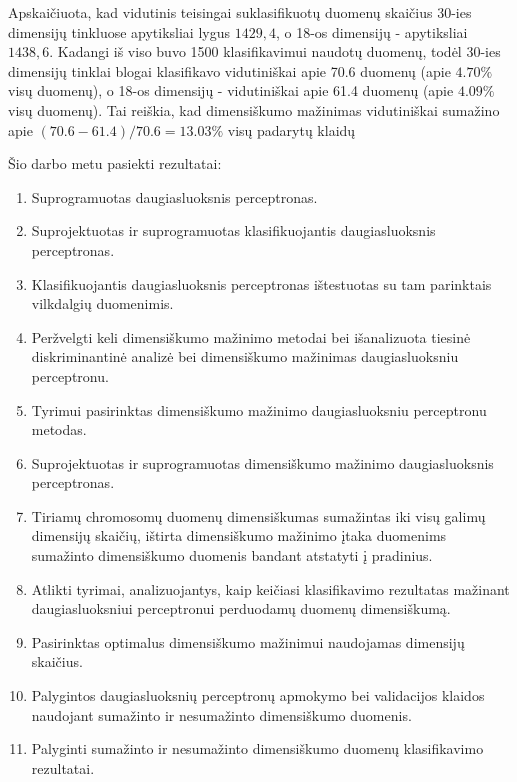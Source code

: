 \documentclass{VUMIFPSbakalaurinis}
\begin{document}
Apskaičiuota, kad vidutinis teisingai suklasifikuotų duomenų skaičius 30-ies dimensijų tinkluose apytiksliai lygus $1429,4$, o 18-os dimensijų - apytiksliai $1438,6$.
Kadangi iš viso buvo 1500 klasifikavimui naudotų duomenų, todėl 30-ies dimensijų tinklai blogai klasifikavo vidutiniškai apie 70.6 duomenų (apie $4.70\%$ visų duomenų), o 18-os dimensijų - vidutiniškai apie 61.4 duomenų (apie $4.09\%$ visų duomenų).
Tai reiškia, kad dimensiškumo mažinimas vidutiniškai sumažino apie $(70.6 - 61.4) / 70.6 = 13.03\%$ visų padarytų klaidų



Šio darbo metu pasiekti rezultatai:
\begin{enumerate}
	\item Suprogramuotas daugiasluoksnis perceptronas.
	\item Suprojektuotas ir suprogramuotas klasifikuojantis daugiasluoksnis perceptronas.
	\item Klasifikuojantis daugiasluoksnis perceptronas ištestuotas su tam parinktais vilkdalgių duomenimis.

	\item Peržvelgti keli dimensiškumo mažinimo metodai bei išanalizuota tiesinė diskriminantinė analizė bei dimensiškumo mažinimas daugiasluoksniu perceptronu.
	\item Tyrimui pasirinktas dimensiškumo mažinimo daugiasluoksniu perceptronu metodas.
	\item Suprojektuotas ir suprogramuotas dimensiškumo mažinimo daugiasluoksnis perceptronas.
	\item Tiriamų chromosomų duomenų dimensiškumas sumažintas iki visų galimų dimensijų skaičių, ištirta dimensiškumo mažinimo įtaka duomenims sumažinto dimensiškumo duomenis bandant atstatyti į pradinius.

	\item Atlikti tyrimai, analizuojantys, kaip keičiasi klasifikavimo rezultatas mažinant daugiasluoksniui perceptronui perduodamų duomenų dimensiškumą.
	\item Pasirinktas optimalus dimensiškumo mažinimui naudojamas dimensijų skaičius.
	
	\item Palygintos daugiasluoksnių perceptronų apmokymo bei validacijos klaidos naudojant sumažinto ir nesumažinto dimensiškumo duomenis.
	\item Palyginti sumažinto ir nesumažinto dimensiškumo duomenų klasifikavimo rezultatai.
\end{enumerate}
\end{document}
